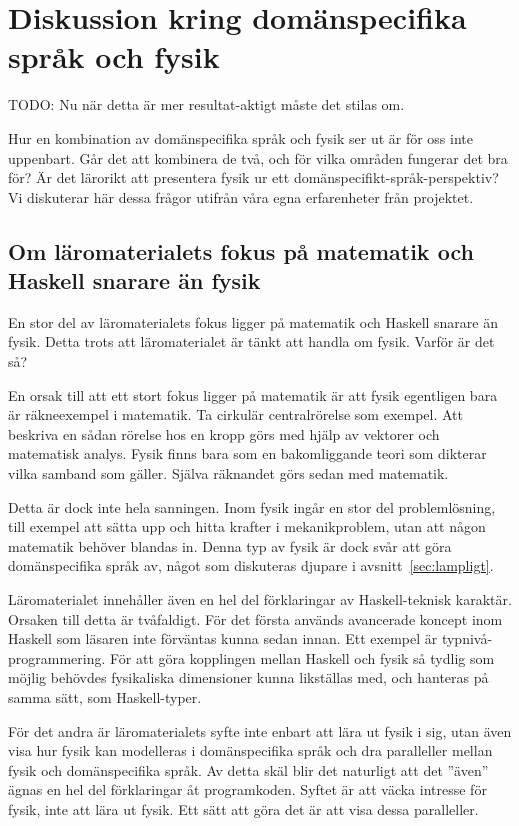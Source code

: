 
\chapter{Diskussion kring domänspecifika språk och fysik}

\begin{binge}

TODO: Nu när detta är mer resultat-aktigt måste det stilas om.

Hur en kombination av domänspecifika språk och fysik ser ut är för oss inte uppenbart. Går det att kombinera de två, och för vilka områden fungerar det bra för? Är det lärorikt att presentera fysik ur ett domänspecifikt-språk-perspektiv? Vi diskuterar här dessa frågor utifrån våra egna erfarenheter från projektet. 

\section{Om läromaterialets fokus på matematik och Haskell snarare än fysik}

En stor del av läromaterialets fokus ligger på matematik och Haskell snarare än fysik. Detta trots att läromaterialet är tänkt att handla om fysik. Varför är det så?

En orsak till att ett stort fokus ligger på matematik är att fysik egentligen bara är räkneexempel i matematik. Ta cirkulär centralrörelse som exempel. Att beskriva en sådan rörelse hos en kropp görs med hjälp av vektorer och matematisk analys. Fysik finns bara som en bakomliggande teori som dikterar vilka samband som gäller. Själva räknandet görs sedan med matematik.

Detta är dock inte hela sanningen. Inom fysik ingår en stor del problemlösning, till exempel att sätta upp och hitta krafter i mekanikproblem, utan att någon matematik behöver blandas in. Denna typ av fysik är dock svår att göra domänspecifika språk av, något som diskuteras djupare i avsnitt~\ref{sec:lampligt}.

Läromaterialet innehåller även en hel del förklaringar av Haskell-teknisk karaktär. Orsaken till detta är tvåfaldigt. För det första används avancerade koncept inom Haskell som läsaren inte förväntas kunna sedan innan. Ett exempel är typnivå-programmering. För att göra kopplingen mellan Haskell och fysik så tydlig som möjlig behövdes fysikaliska dimensioner kunna likställas med, och hanteras på samma sätt, som Haskell-typer.

För det andra är läromaterialets syfte inte enbart att lära ut fysik i sig, utan även visa hur fysik kan modelleras i domänspecifika språk och dra paralleller mellan fysik och domänspecifika språk. Av detta skäl blir det naturligt att det ''även'' ägnas en hel del förklaringar åt programkoden. Syftet är att väcka intresse för fysik, inte att lära ut fysik. Ett sätt att göra det är att visa dessa paralleller.


\end{binge}
